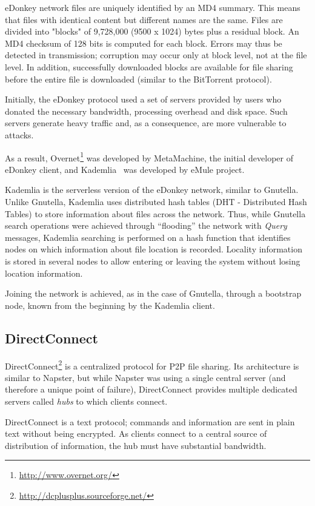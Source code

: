 eDonkey network files are uniquely identified by an MD4 summary. This means
that files with identical content but different names are the same. Files are
divided into "blocks" of 9,728,000 (9500 x 1024) bytes plus a residual block.
An MD4 checksum of 128 bits is computed for each block. Errors may thus be
detected in transmission; corruption may occur only at block level, not
at the file level. In addition, successfully downloaded blocks are available
for file sharing before the entire file is downloaded (similar to the
BitTorrent protocol).

Initially, the eDonkey protocol used a set of servers provided by users who
donated the necessary bandwidth, processing overhead and disk space. Such
servers generate heavy traffic and, as a consequence, are more vulnerable to
attacks.

As a result, Overnet\footnote{\url{http://www.overnet.org/}} was developed by MetaMachine, the initial developer of
eDonkey client, and Kademlia~\cite{kademlia} was developed by eMule project.

Kademlia is the serverless version of the eDonkey network, similar to
Gnutella.  Unlike Gnutella, Kademlia uses distributed hash tables (DHT -
Distributed Hash Tables) to store information about files across the network.
Thus, while Gnutella search operations were achieved through ``flooding'' the
network with \textit{Query} messages, Kademlia searching is performed on a
hash function that identifies nodes on which information about file location
is recorded. Locality information is stored in several nodes to
allow entering or leaving the system without losing location information.

Joining the network is achieved, as in the case of Gnutella, through a bootstrap
node, known from the beginning by the Kademlia client.

\subsection{DirectConnect}

DirectConnect\footnote{\url{http://dcplusplus.sourceforge.net/}} is a centralized protocol for P2P file sharing. Its architecture
is similar to Napster, but while Napster was using a single central server
(and therefore a unique point of failure), DirectConnect provides multiple
dedicated servers called \textit{hubs} to which clients connect.

DirectConnect is a text protocol; commands and information are sent in plain
text
without being encrypted. As clients connect to a central source of
distribution of information, the hub must have substantial bandwidth.

